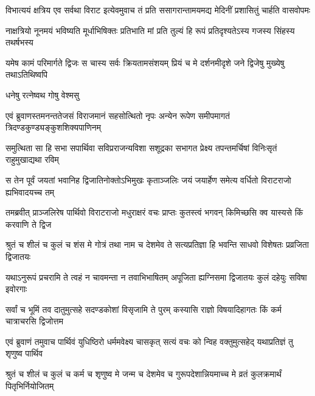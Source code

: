 \fourlineindentedshloka
{विभात्ययं क्षत्रिय एव सर्वथा}
{विराट इत्येवमुवाच तं प्रति}
{ससागरान्तामयमद्य मेदिनीं}
{प्रशासितुं चार्हति वासवोपमः}


\fourlineindentedshloka
{नाक्षत्रियो नूनमयं भविष्यति}
{मूर्धाभिषिक्तः प्रतिभाति मां प्रति}
{तुल्यं हि रूपं प्रतिदृश्यतेऽस्य}
{गजस्य सिंहस्य तथर्षभस्य}


\fourlineindentedshloka
{यमेष कामं परिमार्गते द्विजः}
{स चास्य सर्वः क्रियतामसंशयम्}
{प्रियं च मे दर्शनमीदृशे जने}
{द्विजेषु मुख्येषु तथाऽतिथिष्वपि}



{धनेषु रत्नेष्वथ गोषु वेश्मसु\hspace{\shlokaspaceskip}}\\



\fourlineindentedshloka
{एवं ब्रुवाणस्तमनन्ततेजसं}
{विराजमानं सहसोत्थितो नृपः}
{अन्येन रूपेण समीपमागतं}
{त्रिदण्डकुण्ड्यङ्कुशशिक्यपाणिनम्}


\fourlineindentedshloka
{समुत्थिता सा हि सभा सपार्थिवा}
{सविप्रराजन्यविशा सशूद्रका}
{सभागत प्रेक्ष्य तपन्तमर्चिषां}
{विनिःसृतं राहुमुखाद्यथा रविम्}


\fourlineindentedshloka
{स तेन पूर्वं जयतां भवानिह}
{द्विजातिनोक्तोऽभिमुखः कृताञ्जलिः}
{जयं जयार्हेण समेत्य वर्धितो}
{विराटराजो ह्यभिवादयच्च तम्}


\fourlineindentedshloka
{तमब्रवीत् प्राञ्जलिरेष पार्थिवो}
{विराटराजो मधुराक्षरं वचः}
{प्राप्तः कुतस्त्वं भगवन् किमिच्छसि}
{क्व यास्यसे किं करवाणि ते द्विज}


\fourlineindentedshloka
{श्रुतं च शीलं च कुलं च शंस मे}
{गोत्रं तथा नाम च देशमेव ते}
{सत्यप्रतिज्ञा हि भवन्ति साधवो}
{विशेषतः प्रव्रजिता द्विजातयः}


\fourlineindentedshloka
{यथाऽनुरूपं प्रचरामि ते त्वहं}
{न चावमन्ता न तवाभिभाषितम्}
{अपूजिता ह्यग्निसमा द्विजातयः}
{कुलं दहेयुः सविषा इवोरगाः}


\fourlineindentedshloka
{सर्वां च भूमिं तव दातुमुत्सहे}
{सदण्डकोशां विसृजामि ते पुरम्}
{कस्यासि राज्ञो विषयादिहागतः}
{किं कर्म चात्राचरसि द्विजोत्तम}



\fourlineindentedshloka
{एवं ब्रुवाणं तमुवाच पार्थिवं}
{युधिष्ठिरो धर्ममवेक्ष्य चासकृत्}
{सत्यं वचः को न्विह वक्तुमुत्सहेद्}
{यथाप्रतिज्ञं तु शृणुष्व पार्थिव}


\fourlineindentedshloka
{श्रुतं च शीलं च कुलं च कर्म च}
{शृणुष्व मे जन्म च देशमेव च}
{गुरूपदेशान्नियमाच्च मे व्रतं}
{कुलक्रमार्थं पितृभिर्नियोजितम्}


